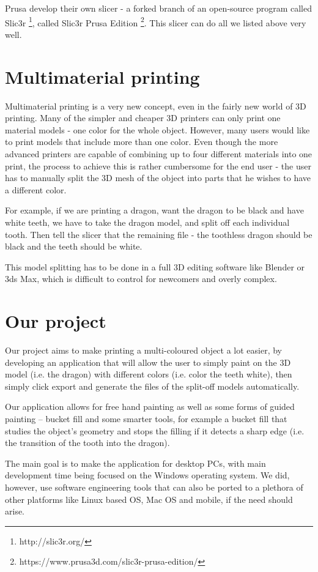 Prusa develop their own slicer - a forked branch of an open-source program called Slic3r \footnote{http://slic3r.org/}, called Slic3r Prusa Edition \footnote{https://www.prusa3d.com/slic3r-prusa-edition/}. This slicer can do all we listed above very well.

\section{Multimaterial printing}

Multimaterial printing is a very new concept, even in the fairly new world of 3D printing. Many of the simpler and cheaper 3D printers can only print one material models - one color for the whole object. However, many users would like to print models that include more than one color. Even though the more advanced printers are capable of combining up to four different materials into one print, the process to achieve this is rather cumbersome for the end user - the user has to manually split the 3D mesh of the object into parts that he wishes to have a different color.

For example, if we are printing a dragon, want the dragon to be black and have white teeth, we have to take the dragon model, and split off each individual tooth. Then tell the slicer that the remaining file - the toothless dragon should be black and the teeth should be white.

This model splitting has to be done in a full 3D editing software like Blender or 3ds Max, which is difficult to control for newcomers and overly complex.

\section{Our project}

Our project aims to make printing a multi-coloured object a lot easier, by developing an application that will allow the user to simply paint on the 3D model (i.e. the dragon) with different colors (i.e. color the teeth white), then simply click export and generate the files of the split-off models automatically.

Our application allows for free hand painting as well as some forms of guided painting -- bucket fill and some smarter tools, for example a bucket fill that studies the object's geometry and stops the filling if it detects a sharp edge (i.e. the transition of the tooth into the dragon).

The main goal is to make the application for desktop PCs, with main development time being focused on the Windows operating system. We did, however, use software engineering tools that can also be ported to a plethora of other platforms like Linux based OS, Mac OS and mobile, if the need should arise.
